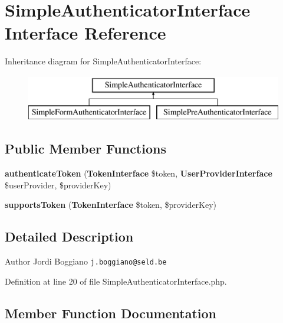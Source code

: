 \section{Simple\+Authenticator\+Interface Interface Reference}
\label{interface_symfony_1_1_component_1_1_security_1_1_core_1_1_authentication_1_1_simple_authenticator_interface}
Inheritance diagram for Simple\+Authenticator\+Interface\+:\begin{figure}[H]
\begin{center}
\leavevmode
\includegraphics[height=2.000000cm]{interface_symfony_1_1_component_1_1_security_1_1_core_1_1_authentication_1_1_simple_authenticator_interface}
\end{center}
\end{figure}
\subsection*{Public Member Functions}
\begin{DoxyCompactItemize}
\item 
{\bf authenticate\+Token} ({\bf Token\+Interface} \$token, {\bf User\+Provider\+Interface} \$user\+Provider, \$provider\+Key)
\item 
{\bf supports\+Token} ({\bf Token\+Interface} \$token, \$provider\+Key)
\end{DoxyCompactItemize}


\subsection{Detailed Description}
\begin{DoxyAuthor}{Author}
Jordi Boggiano {\tt j.\+boggiano@seld.\+be} 
\end{DoxyAuthor}


Definition at line 20 of file Simple\+Authenticator\+Interface.\+php.



\subsection{Member Function Documentation}
